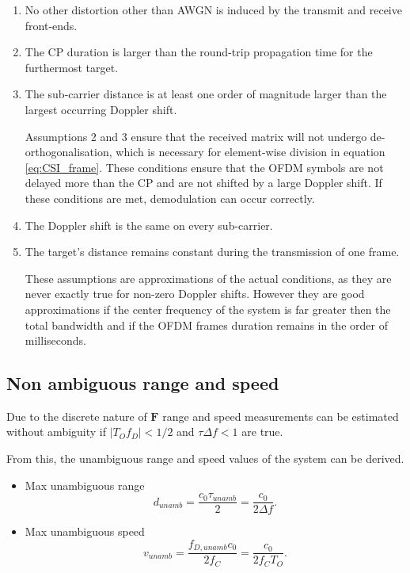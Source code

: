     \begin{enumerate}
    	\item No other distortion other than AWGN is induced by the transmit and receive front-ends.
    	\item The CP duration is larger than the round-trip propagation time for the furthermost target.
    	\item The sub-carrier distance is at least one order of magnitude larger than the largest occurring Doppler shift.
    	
		Assumptions 2 and 3 ensure that the received matrix will not undergo de-orthogonalisation, which is necessary for element-wise division in equation \ref{eq:CSI_frame}. These conditions ensure that the OFDM symbols are not delayed more than the CP and are not shifted by a large Doppler shift. If these conditions are met, demodulation can occur correctly.
    	
    	\item The Doppler shift is the same on every sub-carrier.
    	\item The target’s distance remains constant during the transmission of one frame.
    	
    	These assumptions are approximations of the actual conditions, as they are never exactly true for non-zero Doppler shifts. However they are good approximations if the center frequency of the system is far greater then the total bandwidth and if the OFDM frames duration remains in the order of milliseconds.
    \end{enumerate}
    
    \subsection{Non ambiguous range and speed}
    
        Due to the discrete nature of $\mathbf{F}$ range and speed measurements can be estimated without ambiguity if $|T_O f_D| < 1/2$ and $\tau \Delta f < 1$ are true.
        
        From this, the unambiguous range and speed values of the system can be derived.
        
        \begin{itemize}
            \item Max unambiguous range
            $$ d_{unamb} = \frac{c_0 \tau_{unamb}}{2} = \frac{c_0}{2\Delta f}.$$
            \item Max unambiguous speed
            $$ v_{unamb} = \frac{f_{D,unamb} c_0}{2f_C} = \frac{c_0}{2f_C T_O}.$$
        \end{itemize}
        
